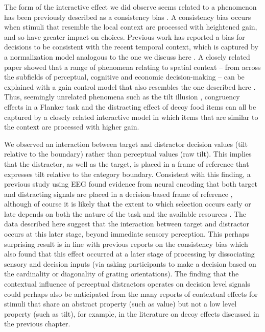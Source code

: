 \documentclass[a4paper, nobind]{templates/ociamthesis}
\begin{document}
The form of the interactive effect we did observe seems related to a phenomenon has been previously described as a consistency bias \autocite{cheadle2014}. A consistency bias occurs when stimuli that resemble the local context are processed with heightened gain, and so have greater impact on choices. Previous work has reported a bias for decisions to be consistent with the recent temporal context, which is captured by a normalization model analogous to the one we discuss here \autocite{cheadle2014}. A closely related paper showed that a range of phenomena relating to spatial context -- from across the subfields of perceptual, cognitive and economic decision-making -- can be explained with a gain control model that also resembles the one described here \autocite{li2018}. Thus, seemingly unrelated phenomena such as the tilt illusion \autocite{blakemore1970}, congruency effects in a Flanker task \autocite{eriksen1974} and the distracting effect of decoy food items \autocite{louie2013} can all be captured by a closely related interactive model in which items that are similar to the context are processed with higher gain.

We observed an interaction between target and distractor decision values (tilt relative to the boundary) rather than perceptual values (raw tilt). This implies that the distractor, as well as the target, is placed in a frame of reference that expresses tilt relative to the category boundary. Consistent with this finding, a previous study using EEG found evidence from neural encoding that both target and distracting signals are placed in a decision-based frame of reference \autocite{wyart2015}, although of course it is likely that the extent to which selection occurs early or late depends on both the nature of the task and the available resources \autocite{lavie1994}. The data described here suggest that the interaction between target and distractor occurs at this later stage, beyond immediate sensory perception. This perhaps surprising result is in line with previous reports on the consistency bias \autocite{cheadle2014} which also found that this effect occurred at a later stage of processing by dissociating sensory and decision inputs (via asking participants to make a decision based on the cardinality or diagonality of grating orientations). The finding that the contextual influence of perceptual distractors operates on decision level signals could perhaps also be anticipated from the many reports of contextual effects for stimuli that share an abstract property (such as value) but not a low level property (such as tilt), for example, in the literature on decoy effects discussed in the previous chapter.
\end{document}
